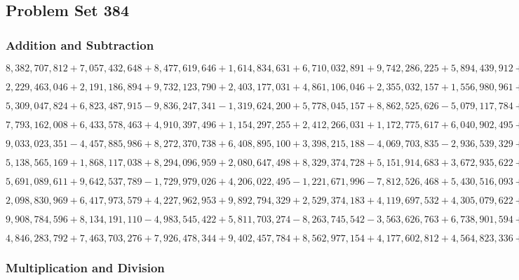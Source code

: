 \hypertarget{problem-set-384}{%
\subsection{Problem Set 384}\label{problem-set-384}}

\hypertarget{addition-and-subtraction}{%
\subsubsection{Addition and
Subtraction}\label{addition-and-subtraction}}

\(8,382,707,812+7,057,432,648+8,477,619,646+1,614,834,631+6,710,032,891+9,742,286,225+5,894,439,912+9,595,093,401+2,870,951,793+1,843,997,338\)

\(2,229,463,046+2,191,186,894+9,732,123,790+2,403,177,031+4,861,106,046+2,355,032,157+1,556,980,961+5,817,501,350+7,464,206,663+6,732,324,538\)

\(5,309,047,824+6,823,487,915-9,836,247,341-1,319,624,200+5,778,045,157+8,862,525,626-5,079,117,784+5,743,499,742+3,822,171,054-4,816,128,866\)

\(7,793,162,008+6,433,578,463+4,910,397,496+1,154,297,255+2,412,266,031+1,172,775,617+6,040,902,495+6,601,238,438+2,035,037,604+5,192,499,429\)

\(9,033,023,351-4,457,885,986+8,272,370,738+6,408,895,100+3,398,215,188-4,069,703,835-2,936,539,329+2,408,644,605+9,174,928,570-8,715,877,628\)

\(5,138,565,169+1,868,117,038+8,294,096,959+2,080,647,498+8,329,374,728+5,151,914,683+3,672,935,622+1,286,975,752+1,433,829,177+2,547,177,563\)

\(5,691,089,611+9,642,537,789-1,729,979,026+4,206,022,495-1,221,671,996-7,812,526,468+5,430,516,093+8,932,896,516+6,457,885,012-1,771,556,017\)

\(2,098,830,969+6,417,973,579+4,227,962,953+9,892,794,329+2,529,374,183+4,119,697,532+4,305,079,622+1,352,479,723+3,180,600,946+3,730,128,780\)

\(9,908,784,596+8,134,191,110-4,983,545,422+5,811,703,274-8,263,745,542-3,563,626,763+6,738,901,594+4,894,041,764+7,757,619,912-8,468,461,584\)

\(4,846,283,792+7,463,703,276+7,926,478,344+9,402,457,784+8,562,977,154+4,177,602,812+4,564,823,336+2,356,723,656+1,367,636,734+3,283,765,007\)

\hypertarget{multiplication-and-division}{%
\subsubsection{Multiplication and
Division}\label{multiplication-and-division}}

